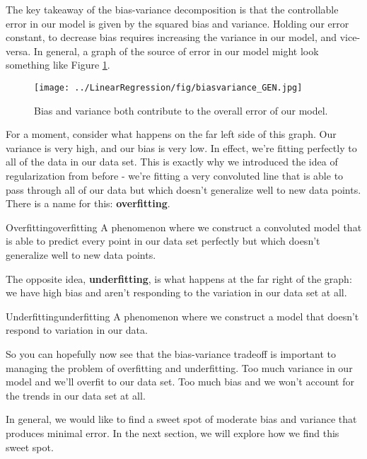 \newpage
The key takeaway of the bias-variance decomposition is that the controllable error in our model is given by the squared bias and variance. Holding our error constant, to decrease bias requires increasing the variance in our model, and vice-versa. In general, a graph of the source of error in our model might look something like Figure \ref{fig:bias-vs-variance}.

\begin{figure}
    \centering
    \texttt{[image: ../LinearRegression/fig/biasvariance\_GEN.jpg]}
    \caption{Bias and variance both contribute to the overall error of our model.}
    \label{fig:bias-vs-variance}
\end{figure}

For a moment, consider what happens on the far left side of this graph. Our variance is very high, and our bias is very low. In effect, we're fitting perfectly to all of the data in our data set. This is exactly why we introduced the idea of regularization from before - we're fitting a very convoluted line that is able to pass through all of our data but which doesn't generalize well to new data points. There is a name for this: \textbf{overfitting}.

\begin{definition}{Overfitting}{overfitting}
    A phenomenon where we construct a convoluted model that is able to predict every point in our data set perfectly but which doesn't generalize well to new data points.
\end{definition}

The opposite idea, \textbf{underfitting}, is what happens at the far right of the graph: we have high bias and aren't responding to the variation in our data set at all.

\begin{definition}{Underfitting}{underfitting}
    A phenomenon where we construct a model that doesn't respond to variation in our data.
\end{definition}

So you can hopefully now see that the bias-variance tradeoff is important to managing the problem of overfitting and underfitting. Too much variance in our model and we'll overfit to our data set. Too much bias and we won't account for the trends in our data set at all.

In general, we would like to find a sweet spot of moderate bias and variance that produces minimal error. In the next section, we will explore how we find this sweet spot.

